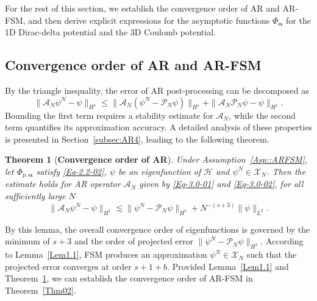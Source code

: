 \documentclass{sn-jnl}%
\numberwithin{equation}{section}
\theoremstyle{thmstyleone}%
\newtheorem{theorem}{Theorem}%
\theoremstyle{thmstyletwo}%
\theoremstyle{thmstylethree}%
\begin{document}
For the rest of this section, we establish the convergence order of AR and AR-FSM, and then derive explicit expressions for the asymptotic functions $\Phi_{\bm \alpha}$ for the 1D Dirac-delta potential and the 3D Coulomb potential.


\subsection{Convergence order of AR and AR-FSM}
By the triangle inequality, the error of AR post-processing can be decomposed as
\begin{equation}
\|\mathcal{A}_N\psi^N-\psi\|_{H^1} \leq \|\mathcal{A}_N(\psi^N-\mathcal{P}_N\psi)\|_{H^{1} } + \|\mathcal{A}_N\mathcal{P}_N\psi - \psi\|_{H^1}.  
\end{equation}
Bounding the first term requires a stability estimate for $\mathcal{A}_N$, while the second term quantifies its approximation accuracy. A detailed analysis of these properties is presented in Section~\ref{subsec:AR4}, leading to the following theorem.
\begin{theorem}[\bf Convergence order of AR]\label{Thm03}  
     Under  Assumption~\ref{Asp::ARFSM}, let $\Phi_{p,\bm \alpha}$ satisfy \eqref{Eq-2.2-02}, $\psi$ be an eigenfunction of $\mathcal{H}$ and  $\psi^N\in \mathscr{X}_N$. 
     Then the estimate holds for AR operator $\mathcal{A}_N$ given by \eqref{Eq-3.0-01} and \eqref{Eq-3.0-02}, for all sufficiently large $N$ 
    \begin{equation}\label{Eq-thm03-01}
    \|\mathcal{A}_N \psi^N-\psi\|_{H^{1}}\lesssim \|\psi^N-\mathcal{P}_N \psi \|_{H^1}+N^{-(s+3)}\|\psi\|_{L^2}.
    \end{equation}
\end{theorem}
By this lemma, the overall convergence order of eigenfunctions is governed by the minimum of  $s+3$ and the order of projected error $\|\psi^N - \mathcal{P}_N \psi\|_{H^1}$. According to Lemma~\ref{Lem1.1}, FSM produces an approximation $\psi^N \in \mathscr{X}_N$ such that the projected error converges at order $s+1+b$. Provided Lemma~\ref{Lem1.1} and Theorem~\ref{Thm03}, we can establish the convergence order of AR-FSM in Theorem~\ref{Thm02}.
\end{document}
